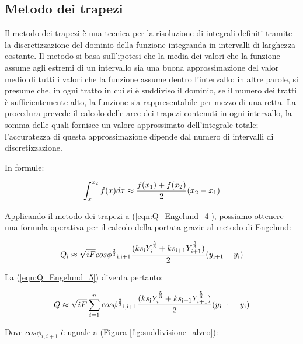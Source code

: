 \documentclass[12pt]{article} %
\begin{document}
\subsection{Metodo dei trapezi}

\noindent Il metodo dei trapezi è una tecnica per la risoluzione di integrali definiti tramite la discretizzazione del dominio della funzione integranda in intervalli di larghezza costante. Il metodo si basa sull’ipotesi che la media dei valori che la funzione assume agli estremi di un intervallo sia una buona approssimazione del valor medio di tutti i valori che la funzione assume dentro l’intervallo; in altre parole, si presume che, in ogni tratto in cui si è suddiviso il dominio, se il numero dei tratti è sufficientemente alto, la funzione sia rappresentabile per mezzo di una retta. La procedura prevede il calcolo delle aree dei trapezi contenuti in ogni intervallo, la somma delle quali fornisce un valore approssimato dell’integrale totale; l'accuratezza di questa approssimazione dipende dal numero di intervalli di discretizzazione.

\noindent In formule:

\begin{equation}
    \int_{x_1}^{x_2} f(x)dx\approx\frac{f(x\textsubscript{1})+f(x\textsubscript{2})}{2}(x\textsubscript{2}-x\textsubscript{1})
    \label{metodo_trapezi}
\end{equation}

\noindent Applicando il metodo dei trapezi a (\ref{eqn:Q_Engelund_4}), possiamo ottenere una formula operativa per il calcolo della portata grazie al metodo di Engelund:

\begin{equation}
    Q\textsubscript{i}\approx\sqrt{iF}cos\phi^{\frac{2}{3}}\textsubscript{i,i+1}\frac{(ks\textsubscript{i}Y_i^{\frac{5}{3}}+ks\textsubscript{i+1}Y_{i+1}^{\frac{5}{3}})}{2}(y\textsubscript{i+1}-y\textsubscript{i})
    \label{eqn:Q_trapezi_1}
\end{equation}

\noindent La (\ref{eqn:Q_Engelund_5}) diventa pertanto:

\begin{equation}
    Q\approx\sqrt{iF}\sum_{i=1}^n cos\phi^{\frac{2}{3}}\textsubscript{i,i+1}\frac{(ks\textsubscript{i}Y_i^{\frac{5}{3}}+ks\textsubscript{i+1}Y_{i+1}^{\frac{5}{3}})}{2}(y\textsubscript{i+1}-y\textsubscript{i})
    \label{eqn:Q_trapezi_2}
\end{equation}

\noindent Dove $cos\phi_{i,i+1}$ è uguale a (Figura \ref{fig:suddivisione_alveo}):
\end{document}
